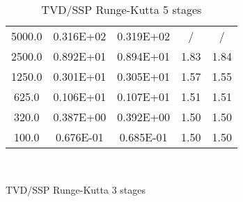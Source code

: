 \documentclass[pdftex,preprint,3p,times,numbers]{elsarticle}
\begin{document}
\begin{table}[!ht]
\begin{subtable}[b]{0.45\textwidth}
{\begin{tabular}{ccccc}
      \hline
      5000.0          &  0.316E+02    &  0.319E+02    & /             & /             \\
      2500.0          &  0.892E+01    &  0.894E+01    & 1.83          & 1.84          \\
      1250.0          &  0.301E+01    &  0.305E+01    & 1.57          & 1.55          \\
       625.0          &  0.106E+01    &  0.107E+01    & 1.51          & 1.51          \\
       320.0          &  0.387E+00    &  0.392E+00    & 1.50          & 1.50          \\
       100.0          &  0.676E-01    &  0.685E-01    & 1.50          & 1.50          \\
      \bottomrule
    \end{tabular}}
  \end{subtable}\\
  \begin{subtable}[b]{0.45\textwidth}
    \centering
    \caption{TVD/SSP Runge-Kutta 3 stages}\label{tab:oscillation-tvd-rk-3}
  \end{subtable}\quad%
  \begin{subtable}[b]{0.45\textwidth}
    \centering
    \caption{TVD/SSP Runge-Kutta 5 stages}\label{tab:oscillation-tvd-rk-5}
\end{subtable}
\end{table}
\end{document}
